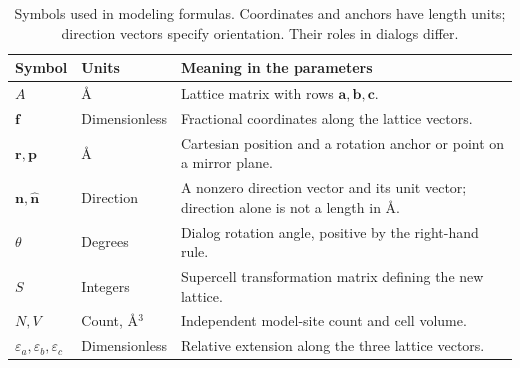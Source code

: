 \begin{table}[!htb]
\centering\small
\begin{tabularx}{\linewidth}{llX}
\toprule
Symbol & Units & Meaning in the parameters\\
\midrule
$A$ & \AA & Lattice matrix with rows $\mathbf a,\mathbf b,\mathbf c$.\\
$\mathbf f$ & Dimensionless & Fractional coordinates along the lattice vectors.\\
$\mathbf r,\mathbf p$ & \AA & Cartesian position and a rotation anchor or point on a mirror plane.\\
$\mathbf n,\hat{\mathbf n}$ & Direction & A nonzero direction vector and its unit vector; direction alone is not a length in \AA.\\
$\theta$ & Degrees & Dialog rotation angle, positive by the right-hand rule.\\
$S$ & Integers & Supercell transformation matrix defining the new lattice.\\
$N,V$ & Count, \AA$^3$ & Independent model-site count and cell volume.\\
$\varepsilon_a,\varepsilon_b,\varepsilon_c$ & Dimensionless & Relative extension along the three lattice vectors.\\
\bottomrule
\end{tabularx}
\caption{Symbols used in modeling formulas. Coordinates and anchors have length units; direction vectors specify orientation. Their roles in dialogs differ.}
\label{tab:round10-modeling-symbols}
\end{table}
